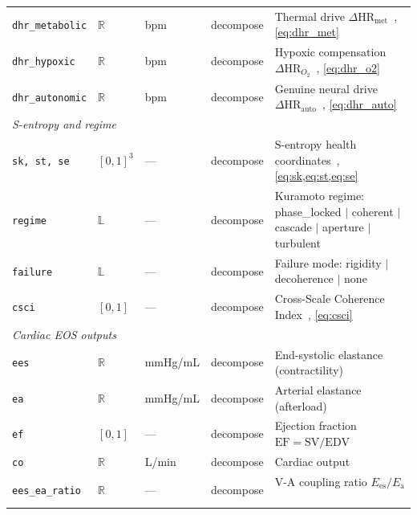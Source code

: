 \documentclass[10pt,twocolumn,a4paper]{article}
\theoremstyle{definition}
\theoremstyle{remark}
\newcommand{\Ees}{E_{\mathrm{es}}}
\newcommand{\Ea}{E_{\mathrm{a}}}
\newcommand{\EDV}{\mathrm{EDV}}
\newcommand{\EF}{\mathrm{EF}}
\newcommand{\SV}{\mathrm{SV}}
\newcommand{\HR}{\mathrm{HR}}
\begin{document}
\begin{table}[ht]
\begin{tabularx}{\textwidth}{llllX}
\texttt{dhr\_metabolic} & $\mathbb{R}$ & bpm       & decompose & Thermal drive $\Delta\HR_{\mathrm{met}}$~\cite{sachikonye2024disambiguation,sachikonye2024optical}, \cref{eq:dhr_met} \\
\texttt{dhr\_hypoxic}   & $\mathbb{R}$ & bpm       & decompose & Hypoxic compensation $\Delta\HR_{O_2}$~\cite{sachikonye2024disambiguation}, \cref{eq:dhr_o2} \\
\texttt{dhr\_autonomic} & $\mathbb{R}$ & bpm       & decompose & Genuine neural drive $\Delta\HR_{\mathrm{auto}}$~\cite{sachikonye2024disambiguation}, \cref{eq:dhr_auto} \\
\midrule
\multicolumn{5}{l}{\textit{S-entropy and regime}} \\
\texttt{sk, st, se}     & $[0,1]^3$    & —         & decompose & S-entropy health coordinates~\cite{sachikonye2024disambiguation}, \cref{eq:sk,eq:st,eq:se} \\
\texttt{regime}         & $\mathbb{L}$ & —         & decompose & Kuramoto regime: phase\_locked $|$ coherent $|$ cascade $|$ aperture $|$ turbulent~\cite{sachikonye2024disambiguation} \\
\texttt{failure}        & $\mathbb{L}$ & —         & decompose & Failure mode: rigidity $|$ decoherence $|$ none~\cite{sachikonye2024disambiguation} \\
\texttt{csci}           & $[0,1]$      & —         & decompose & Cross-Scale Coherence Index~\cite{sachikonye2024disambiguation}, \cref{eq:csci} \\
\midrule
\multicolumn{5}{l}{\textit{Cardiac EOS outputs}} \\
\texttt{ees}            & $\mathbb{R}$ & mmHg/mL   & decompose & End-systolic elastance (contractility)~\cite{sachikonye2024eos} \\
\texttt{ea}             & $\mathbb{R}$ & mmHg/mL   & decompose & Arterial elastance (afterload)~\cite{sachikonye2024eos} \\
\texttt{ef}             & $[0,1]$      & —         & decompose & Ejection fraction $\EF = \SV/\EDV$~\cite{sachikonye2024eos} \\
\texttt{co}             & $\mathbb{R}$ & L/min     & decompose & Cardiac output~\cite{sachikonye2024eos,sachikonye2024cardiovascular} \\
\texttt{ees\_ea\_ratio} & $\mathbb{R}$ & —         & decompose & V-A coupling ratio $\Ees/\Ea$~\cite{sachikonye2024eos} \\
\bottomrule
\end{tabularx}
\end{table}
\end{document}
